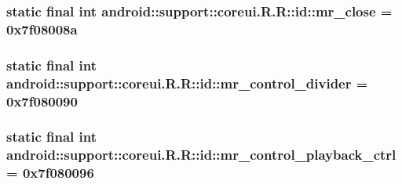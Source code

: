 \hypertarget{classandroid_1_1support_1_1coreui_1_1_r_1_1id_a4be16e7d390c6cbf3485a222fa449e8}{
\subsubsection[{mr\_\-close}]{\setlength{\rightskip}{0pt plus 5cm}static final int android::support::coreui.R.R::id::mr\_\-close = 0x7f08008a}}
\label{classandroid_1_1support_1_1coreui_1_1_r_1_1id_a4be16e7d390c6cbf3485a222fa449e8}


\hypertarget{classandroid_1_1support_1_1coreui_1_1_r_1_1id_2b97e1b86730676b222bad2b03b56986}{
\subsubsection[{mr\_\-control\_\-divider}]{\setlength{\rightskip}{0pt plus 5cm}static final int android::support::coreui.R.R::id::mr\_\-control\_\-divider = 0x7f080090}}
\label{classandroid_1_1support_1_1coreui_1_1_r_1_1id_2b97e1b86730676b222bad2b03b56986}


\hypertarget{classandroid_1_1support_1_1coreui_1_1_r_1_1id_791e0dd74ef0082b49dae370a01efdd3}{
\subsubsection[{mr\_\-control\_\-playback\_\-ctrl}]{\setlength{\rightskip}{0pt plus 5cm}static final int android::support::coreui.R.R::id::mr\_\-control\_\-playback\_\-ctrl = 0x7f080096}}
\label{classandroid_1_1support_1_1coreui_1_1_r_1_1id_791e0dd74ef0082b49dae370a01efdd3}


